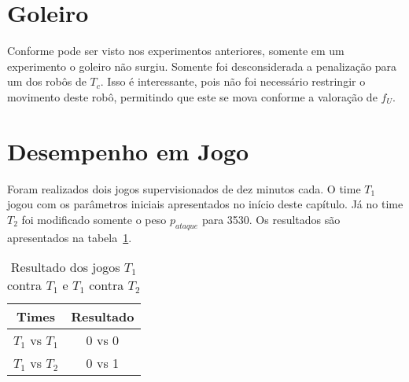 
%
%
%




\section{Goleiro}
Conforme pode ser visto nos experimentos anteriores,
somente em um experimento o goleiro não surgiu.
Somente foi desconsiderada a penalização para um
dos robôs de $T_c$. Isso é interessante, pois
não foi necessário restringir o movimento deste
robô, permitindo que este se mova conforme a
valoração de $f_U$.

\section{Desempenho em Jogo}
Foram realizados dois jogos supervisionados de dez minutos cada.
O time $T_1$ jogou com os parâmetros iniciais apresentados no
início deste capítulo. Já no time $T_2$ foi modificado
somente o peso $p_{ataque}$ para 3530. Os resultados são apresentados
na tabela~\ref{tab:games}.

\begin{table}
  \begin{center}
  \begin{tabular}{|c|c|}
    \hline
    Times      & Resultado \\
    \hline
    $T_1$ vs $T_1$ &  0 vs 0   \\
    \hline
    $T_1$ vs $T_2$ &  0 vs 1   \\
    \hline
  \end{tabular}
  \caption{Resultado dos jogos $T_1$ contra $T_1$ e $T_1$ contra $T_2$}\label{tab:games}
  \end{center}
\end{table}
